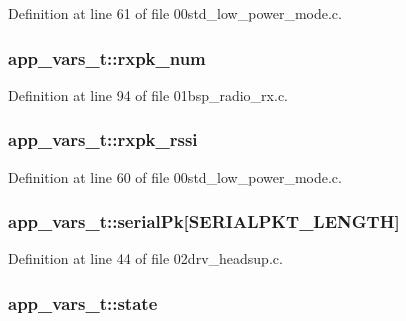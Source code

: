 Definition at line 61 of file 00std\+\_\+low\+\_\+power\+\_\+mode.\+c.

\subsubsection[{\texorpdfstring{rxpk\+\_\+num}{rxpk_num}}]{ app\+\_\+vars\+\_\+t\+::rxpk\+\_\+num}\hypertarget{structapp__vars__t_a2e2d5e7e8da76c605ac5865e18dd6139}{}\label{structapp__vars__t_a2e2d5e7e8da76c605ac5865e18dd6139}


Definition at line 94 of file 01bsp\+\_\+radio\+\_\+rx.\+c.

\subsubsection[{\texorpdfstring{rxpk\+\_\+rssi}{rxpk_rssi}}]{ app\+\_\+vars\+\_\+t\+::rxpk\+\_\+rssi}\hypertarget{structapp__vars__t_aa8ca5ecdac56672f79206632354e5ee3}{}\label{structapp__vars__t_aa8ca5ecdac56672f79206632354e5ee3}


Definition at line 60 of file 00std\+\_\+low\+\_\+power\+\_\+mode.\+c.

\subsubsection[{\texorpdfstring{serial\+Pk}{serialPk}}]{ app\+\_\+vars\+\_\+t\+::serial\+Pk\mbox{[}{\bf S\+E\+R\+I\+A\+L\+P\+K\+T\+\_\+\+L\+E\+N\+G\+TH}\mbox{]}}\hypertarget{structapp__vars__t_a03d9c6352e8ea145bd5881e58446fc40}{}\label{structapp__vars__t_a03d9c6352e8ea145bd5881e58446fc40}


Definition at line 44 of file 02drv\+\_\+headsup.\+c.

\subsubsection[{\texorpdfstring{state}{state}}]{ app\+\_\+vars\+\_\+t\+::state}\hypertarget{structapp__vars__t_a6ead57edd284a2bb41867442f7846518}{}\label{structapp__vars__t_a6ead57edd284a2bb41867442f7846518}


